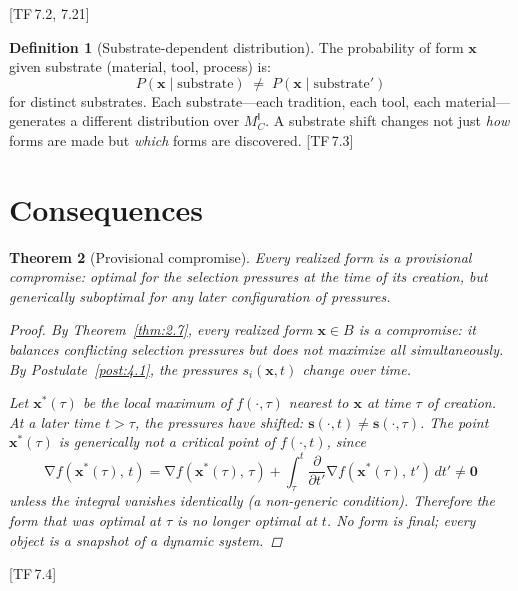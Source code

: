 \documentclass[11pt, a4paper]{article}
\theoremstyle{definition}
\newtheorem{definition}{Definition}[section]
\theoremstyle{plain}
\newtheorem{theorem}[definition]{Theorem}
\theoremstyle{remark}
\newcommand{\MC}{M^{\mathsf{I}}_C}          %
\DeclareMathOperator{\grad}{\nabla}
\newcommand{\TF}[1]{\textnormal{[TF\,#1]}}  %
\begin{document}
\TF{7.2, 7.21}

\begin{definition}[Substrate-dependent distribution]\label{def:9.5}
The probability of form $\bm{x}$ given substrate (material, tool,
process) is:
\[
  P(\bm{x} \mid \text{substrate}) \;\neq\;
  P(\bm{x} \mid \text{substrate}')
\]
for distinct substrates. Each substrate---each tradition, each tool,
each material---generates a different distribution over $\MC$. A
substrate shift changes not just \emph{how} forms are made but
\emph{which} forms are discovered. \TF{7.3}
\end{definition}


\newpage
\section{Consequences}\label{sec:consequences}

\begin{theorem}[Provisional compromise]\label{thm:10.1}
Every realized form is a \emph{provisional} compromise: optimal for the
selection pressures at the time of its creation, but generically
suboptimal for any later configuration of pressures.

\begin{proof}
By Theorem~\ref{thm:2.7}, every realized form $\bm{x} \in B$ is a
compromise: it balances conflicting selection pressures but does not
maximize all simultaneously. By Postulate~\ref{post:4.1}, the pressures
$s_i(\bm{x}, t)$ change over time.

Let $\bm{x}^*(\tau)$ be the local maximum of
$f(\cdot, \tau)$ nearest to $\bm{x}$ at time $\tau$ of creation. At a
later time $t > \tau$, the pressures have shifted:
$\bm{s}(\cdot, t) \neq \bm{s}(\cdot, \tau)$. The point
$\bm{x}^*(\tau)$ is generically \emph{not} a critical point of
$f(\cdot, t)$, since
\[
  \grad f(\bm{x}^*(\tau),\, t) =
  \grad f(\bm{x}^*(\tau),\, \tau) +
  \int_\tau^t \frac{\partial}{\partial t'} \grad f(\bm{x}^*(\tau),\, t')\, dt'
  \neq \bm{0}
\]
unless the integral vanishes identically (a non-generic condition).
Therefore the form that was optimal at $\tau$ is no longer optimal at $t$.
No form is final; every object is a snapshot of a dynamic system.
\qedhere
\end{proof}
\end{theorem}

\TF{7.4}
\end{document}
